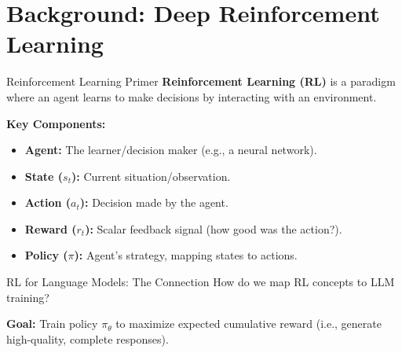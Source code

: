 \documentclass[xcolor=svgnames, 10pt, handout]{beamer}
\begin{document}
\section{Background: Deep Reinforcement Learning}

\begin{frame}{Reinforcement Learning Primer}
    \textbf{Reinforcement Learning (RL)} is a paradigm where an agent learns to make decisions by interacting with an environment.
    \pause

    \begin{center}
    \end{center}
    \pause

    \textbf{Key Components:}
    \begin{itemize}
        \item \textbf{Agent:} The learner/decision maker (e.g., a neural network).
        \item \textbf{State ($s_t$):} Current situation/observation.
        \item \textbf{Action ($a_t$):} Decision made by the agent.
        \item \textbf{Reward ($r_t$):} Scalar feedback signal (how good was the action?).
        \item \textbf{Policy ($\pi$):} Agent's strategy, mapping states to actions.
    \end{itemize}
\end{frame}

\begin{frame}{RL for Language Models: The Connection}
    How do we map RL concepts to LLM training?
    \pause

    \begin{center}
    \end{center}
    \pause

    \textbf{Goal:} Train policy $\pi_\theta$ to maximize expected cumulative reward (i.e., generate high-quality, complete responses).
\end{frame}
\end{document}
